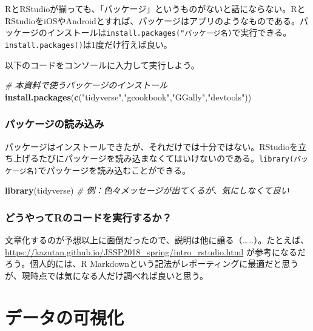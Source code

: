 \documentclass[]{book}
\newenvironment{Shaded}{\begin{snugshade}}{\end{snugshade}}
\newcommand{\KeywordTok}[1]{\textcolor[rgb]{0.13,0.29,0.53}{\textbf{#1}}}
\newcommand{\StringTok}[1]{\textcolor[rgb]{0.31,0.60,0.02}{#1}}
\newcommand{\CommentTok}[1]{\textcolor[rgb]{0.56,0.35,0.01}{\textit{#1}}}
\newcommand{\NormalTok}[1]{#1}
\begin{document}
RとRStudioが揃っても、「パッケージ」というものがないと話にならない。RとRStudioをiOSやAndroidとすれば、パッケージはアプリのようなものである。パッケージのインストールは\texttt{install.packages("パッケージ名)}で実行できる。\texttt{install.packages()}は1度だけ行えば良い。

以下のコードをコンソールに入力して実行しよう。

\begin{Shaded}
\begin{Highlighting}[]
\CommentTok{# 本資料で使うパッケージのインストール}
\KeywordTok{install.packages}\NormalTok{(}\KeywordTok{c}\NormalTok{(}\StringTok{"tidyverse"}\NormalTok{,}\StringTok{"gcookbook"}\NormalTok{,}\StringTok{"GGally"}\NormalTok{,}\StringTok{"devtools"}\NormalTok{))}
\end{Highlighting}
\end{Shaded}

\section{パッケージの読み込み}

パッケージはインストールできたが、それだけでは十分ではない。RStudioを立ち上げるたびにパッケージを読み込まなくてはいけないのである。\texttt{library(パッケージ名)}でパッケージを読み込むことができる。

\begin{Shaded}
\begin{Highlighting}[]
\KeywordTok{library}\NormalTok{(tidyverse) }\CommentTok{# 例：色々メッセージが出てくるが、気にしなくて良い}
\end{Highlighting}
\end{Shaded}

\section{どうやってRのコードを実行するか？}\label{r}

文章化するのが予想以上に面倒だったので、説明は他に譲る（\ldots{}\ldots{}）。たとえば、\url{https://kazutan.github.io/JSSP2018_spring/intro_rstudio.html}
が参考になるだろう。個人的には、R
Markdownという記法がレポーティングに最適だと思うが、現時点では気になる人だけ調べれば良いと思う。

\part*{データの可視化}\label{part-}
\end{document}
